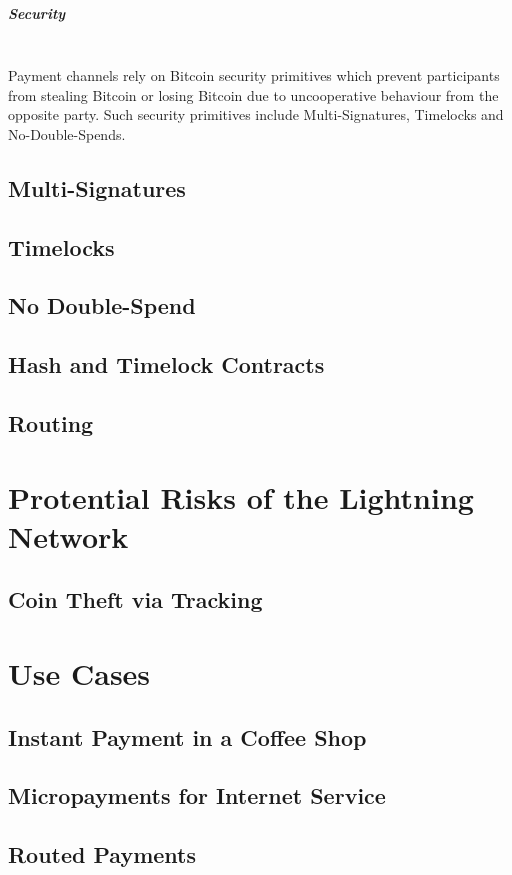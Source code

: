 \documentclass[a4paper, 12pt]{report}
\begin{document}
\paragraph{Security} \hspace{0pt} \\
Payment channels rely on Bitcoin security primitives which prevent participants from stealing Bitcoin or losing Bitcoin due to uncooperative behaviour from the opposite party. Such security primitives include Multi-Signatures, Timelocks and No-Double-Spends.

\section{Multi-Signatures}
\section{Timelocks}
\section{No Double-Spend}
\section{Hash and Timelock Contracts}
\section{Routing}

\chapter{Protential Risks of the Lightning Network}
\section{Coin Theft via Tracking}

\chapter{Use Cases}
\section{Instant Payment in a Coffee Shop}
\section{Micropayments for Internet Service}
\section{Routed Payments}
\end{document}
